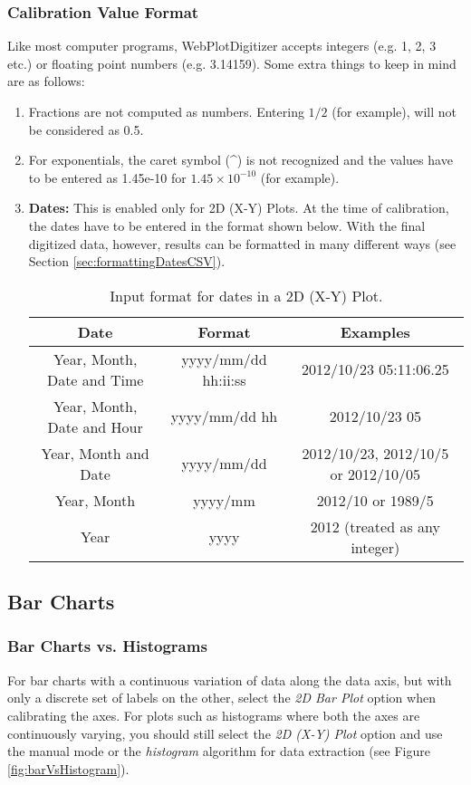 \documentclass[letterpaper, 11pt]{article}
\begin{document}
\subsubsection{Calibration Value Format}
\label{sec:formattingInput}
Like most computer programs, WebPlotDigitizer accepts integers (e.g. 1, 2, 3 etc.) or floating point numbers (e.g. 3.14159). Some extra things to keep in mind are as follows:
\begin{enumerate}
\item{Fractions are not computed as numbers. Entering $1/2$ (for example), will not be considered as 0.5.}
\item{For exponentials, the caret symbol (\^{}) is not recognized and the values have to be entered as 1.45e-10 for $1.45 \times 10^{-10}$ (for example).}
\item{{\bf Dates:} This is enabled only for 2D (X-Y) Plots. At the time of calibration, the dates have to be entered in the format shown below. With the final digitized data, however, results can be formatted in many different ways (see Section \ref{sec:formattingDatesCSV}).
\begin{center}
\begin{table}[h]	
\caption{Input format for dates in a 2D (X-Y) Plot.}
\begin{tabular}{|c|c|c|}
\hline
Date & Format & Examples\\
\hline
Year, Month, Date and Time & yyyy/mm/dd hh:ii:ss & 2012/10/23 05:11:06.25\\
Year, Month, Date and Hour & yyyy/mm/dd hh & 2012/10/23 05\\ 
Year, Month and Date & yyyy/mm/dd & 2012/10/23, 2012/10/5 or 2012/10/05\\
Year, Month & yyyy/mm & 2012/10 or 1989/5\\
Year & yyyy & 2012 (treated as any integer)\\
\hline
\end{tabular}
\end{table}
\end{center}
}
\end{enumerate}


\subsection{Bar Charts}

\subsubsection{Bar Charts vs. Histograms}
For bar charts with a continuous variation of data along the data axis, but with only a discrete set of labels on the other, select the \emph{2D Bar Plot} option when calibrating the axes. For plots such as histograms where both the axes are continuously varying, you should still select the \emph{2D (X-Y) Plot} option and use the manual mode or the \emph{histogram} algorithm for data extraction (see Figure \ref{fig:barVsHistogram}).
\end{document}
